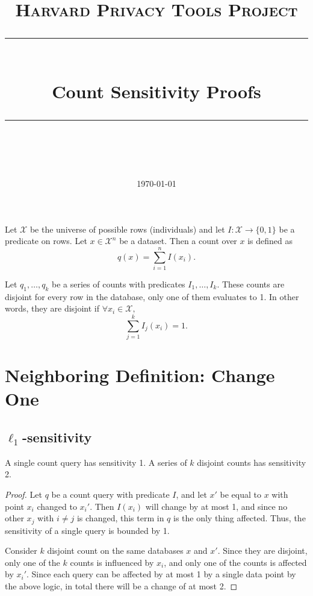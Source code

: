 \documentclass[11pt]{scrartcl} %
\title{
	\normalfont\normalsize
	\textsc{Harvard Privacy Tools Project}\\ %
	\vspace{25pt} %
	\rule{\linewidth}{0.5pt}\\ %
	\vspace{20pt} %
	{\huge Count Sensitivity Proofs}\\ %
	\vspace{12pt} %
	\rule{\linewidth}{2pt}\\ %
	\vspace{12pt} %
}
\date{\normalsize\today} %
\begin{document}
\maketitle

\begin{definition}
Let $\mathcal{X}$ be the universe of possible rows (individuals) and let $I: \mathcal{X} \rightarrow \{0,1\}$ be a predicate on rows. Let $x \in \mathcal{X}^n$ be a dataset. Then a count over $x$ is defined as 
$$ q(x) = \sum_{i=1}^n I(x_i).$$
\end{definition}

\begin{definition}
Let $q_1, \ldots, q_k$ be a series of counts with predicates $I_1, \ldots, I_k$. These counts are disjoint for every row in the database, only one of them evaluates to 1. In other words, they are disjoint if $\forall x_i \in \mathcal{X},$ 
$$ \sum_{j=1}^k I_j(x_i) = 1.$$
\end{definition}

\section{Neighboring Definition: Change One}

\subsection{$\ell_1$-sensitivity}

\begin{theorem}
\label{thm:change1L1}
A single count query has sensitivity 1. A series of $k$ disjoint counts has sensitivity 2.
\end{theorem}

\begin{proof}
Let $q$ be a count query with predicate $I$, and let $x'$ be equal to $x$ with point $x_i$ changed to $x_i'$. Then $I(x_i)$ will change by at most 1, and since no other $x_j$ with $i \ne j$ is changed, this term in $q$ is the only thing affected. Thus, the sensitivity of a single query is bounded by 1.

Consider $k$ disjoint count on the same databases $x$ and $x'$. Since they are disjoint, only one of the $k$ counts is influenced by $x_i$, and only one of the counts is affected by $x_i'$. Since each query can be affected by at most 1 by a single data point by the above logic, in total there will be a change of at most 2.
\end{proof}
\end{document}
